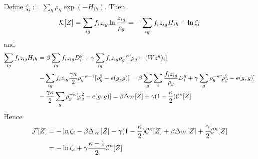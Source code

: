 \documentclass[11pt]{paper}
\begin{document}
Define $\zeta_i:=\sum_h \rho_h \exp(- H_{ih})$. Then 
\begin{equation}
\label{ }
{\cal K}[Z]=\sum_{ig}f_i z_{ig}\ln \frac{z_{ig}}{\rho_g}=-\sum_{ig}f_i z_{ig} H_{ih}-\ln \zeta_i
\end{equation}
and
\begin{align}
\label{ }
\sum_{ig}f_i z_{ig} H_{ih}& =\beta\sum_{ig}f_i z_{ig}D_i^g +\gamma\sum_{ig}f_i z_{ig} \rho_g^{-\kappa} [\rho_g-(Wz^g)_i] \notag \\
 & -\sum_{ig}f_i z_{ig}\frac{\gamma\kappa}{2} \rho_g^{-\kappa-1}[\rho_g^2-e(g,g)]=
 \beta\sum_{g}\sum_i \frac{f_i z_{ig}}{\rho_g}D_i^g+\gamma\sum_{g} \rho_g^{-\kappa} [\rho_g^2-e(g,g)] \notag \\ & 
 -\frac{\gamma\kappa}{2} \sum_g\rho_g^{-\kappa}[\rho_g^2-e(g,g)]=\beta\Delta_W[Z]+\gamma(1-\frac{\kappa}{2}){\cal C}^\kappa[Z]
\end{align}
Hence
\begin{align}
\label{fee3}
{\cal F}[Z] &=-\ln \zeta_i -\beta\Delta_W[Z]-\gamma(1-\frac{\kappa}{2}){\cal C}^\kappa[Z]+\beta\Delta_W[Z]+\frac{\gamma}{2} {\cal C}^\kappa[Z]
\notag \\ 
& =-\ln \zeta_i +\gamma\frac{\kappa-1}{2}{\cal C}^\kappa[Z]
\end{align}
\end{document}
